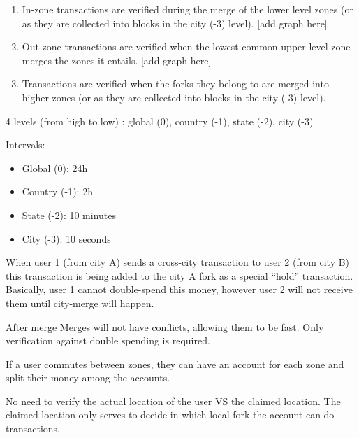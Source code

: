 \documentclass[portrait,a0paper,fontscale=0.285]{baposter} %
\begin{document}
\begin{poster}
{\begin{multicols}{2}
\begin{enumerate}
    \item In-zone transactions are verified during the merge of the lower level zones (or as they are collected into blocks in the city (-3) level). [add graph here]

    \item Out-zone transactions are verified when the lowest common upper level zone merges the zones it entails. [add graph here]

    \item Transactions are verified when the forks they belong to are merged into higher zones (or as they are collected into blocks in the city (-3) level).

\end{enumerate}

4 levels (from high to low) : global (0), country (-1), state (-2), city (-3)

Intervals:
\begin{itemize}
    \item Global (0): 24h
    \item Country (-1): 2h
    \item State (-2): 10 minutes
    \item City (-3): 10 seconds
\end{itemize}

When user 1 (from city A)  sends a cross-city transaction to user 2 (from city B) this transaction is being added to the city A fork as a special  “hold” transaction. Basically, user 1 cannot double-spend this money, however user 2 will not receive them until city-merge will happen.

After merge 
Merges will not have conflicts, allowing them to be fast.  Only verification against double spending is required.

If a user commutes between zones, they can have an account for each zone and split their money among the accounts.

No need to verify the actual location of the user VS the claimed location.  The claimed location only serves to decide in which local fork the account can do transactions.





\end{multicols}}
\end{poster}
\end{document}
